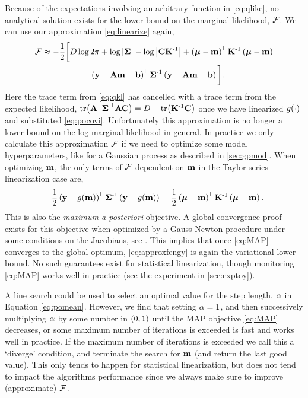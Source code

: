\documentclass{article} %
\begin{document}
Because of the expectations involving an arbitrary function in
\eqref{eq:qlike}, no analytical solution exists for the lower bound on the
marginal likelihood, $\mathcal{F}$. We can use our approximation
\eqref{eq:linearize} again,
\begin{multline}
    \mathcal{F} \approx - \frac{1}{2} \bigg[
    D\log{2\pi} + \log\left|{\boldsymbol{\Sigma}}\right| - \log\left|{\mathbf{C}\mathbf{K}^{\text{-}1}}\right|
    + \left({\boldsymbol{\mu} - \mathbf{m}}\right)^{\!\top}\mathbf{K}^{\text{-}1}
    \left({\boldsymbol{\mu} - \mathbf{m}}\right) \\
    + \left({\mathbf{y} - \mathbf{A}\mathbf{m} - \mathbf{b}}\right)^{\!\top}\boldsymbol{\Sigma}^{\text{-}1}
        \left({\mathbf{y} - \mathbf{A}\mathbf{m} - \mathbf{b}}\right)
        \bigg].
    \label{eq:approxfengy}
\end{multline}
Here the trace term from \eqref{eq:qkl} has cancelled with a trace term from
the expected likelihood, $\text{tr}\!\left({\mathbf{A}^{\!\top}\boldsymbol{\Sigma}^{\text{-}1}\mathbf{A}\mathbf{C}}\right) = D -
\text{tr}\!\left({\mathbf{K}^{\text{-}1}\mathbf{C}}\right)$ once we have linearized $g\!\left({{\cdot}}\right)$ and
substituted \eqref{eq:pocovi}. Unfortunately this approximation is no longer a
lower bound on the log marginal likelihood in general. In practice we only
calculate this approximation $\mathcal{F}$ if we need to optimize some model
hyperparameters, like for a Gaussian process as described in
\autoref{sec:gpmod}. When optimizing $\mathbf{m}$, the only terms of $\mathcal{F}$
dependent on $\mathbf{m}$ in the Taylor series linearization case are,
\begin{equation}
    -\frac{1}{2} \left({\mathbf{y} - g\!\left({{\mathbf{m}}}\right)}\right)^{\!\top}
            \boldsymbol{\Sigma}^{\text{-}1}
            \left({\mathbf{y} - g\!\left({{\mathbf{m}}}\right)}\right) \\
    -\frac{1}{2}
    \left({\boldsymbol{\mu} - \mathbf{m}}\right)^{\!\top}\mathbf{K}^{\text{-}1}\left({\boldsymbol{\mu} - \mathbf{m}}\right).
    \label{eq:MAP}
\end{equation}
This is also the \emph{maximum a-posteriori} objective. A global convergence
proof exists for this objective when optimized by a Gauss-Newton procedure
under some conditions on the Jacobians, see \cite[p255]{Nocedal2006}. This
implies that once \eqref{eq:MAP} converges to the global optimum,
\eqref{eq:approxfengy} is again the variational lower bound. No such guarantees
exist for statistical linearization, though monitoring \eqref{eq:MAP} works
well in practice (see the experiment in \autoref{sec:exptoy}). 

A line search could be used to select an optimal value for the step length,
$\alpha$ in Equation \eqref{eq:pomean}. However, we find that setting $\alpha=1$,
and then successively multiplying $\alpha$ by some number in $\left({0, 1}\right)$ until
the MAP objective \eqref{eq:MAP} decreases, or some maximum number of
iterations is exceeded is fast and works well in practice. If the maximum
number of iterations is exceeded we call this a `diverge' condition, and
terminate the search for $\mathbf{m}$ (and return the last good value). This only
tends to happen for statistical linearization, but does not tend to impact the
algorithms performance since we always make sure to improve (approximate)
$\mathcal{F}$.
\end{document}
